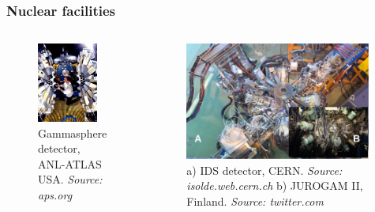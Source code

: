 \documentclass[
	11pt, %
]{beamer}
\begin{document}
\begin{frame}
	\frametitle{Nuclear facilities}
	\begin{columns}
		\begin{figure}
		\centering
		\includegraphics[width=0.86\textwidth]{figures/gsfig.jpg}
		\caption{Gammasphere detector, ANL-ATLAS USA. \textit{Source: aps.org}}
	\end{figure}
	\begin{figure}
		\centering
		\includegraphics[width=0.98\textwidth]{figures/isolde_cern_2.png}
		\caption{a) IDS detector, CERN. \textit{Source: isolde.web.cern.ch} b) JUROGAM II, Finland. \textit{Source: twitter.com}}
		\end{figure}
	\end{columns}
\end{frame}
\end{document}
